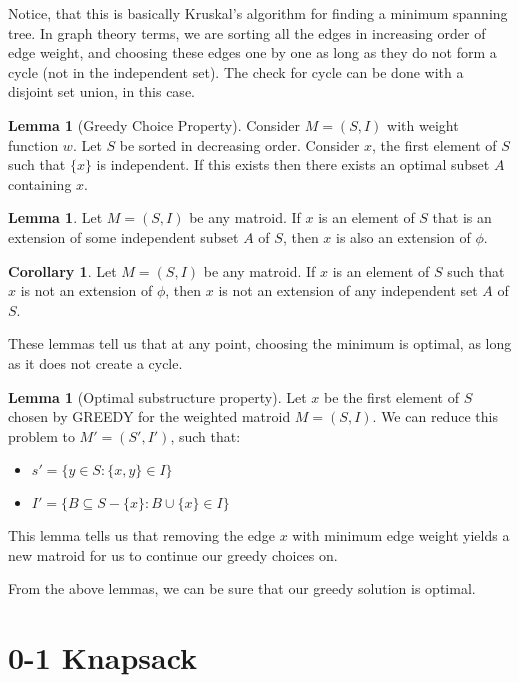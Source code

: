 \documentclass[12pt,letterpaper]{article}
\theoremstyle{definition}
\newtheorem{corollary}{Corollary}[theorem] %
\newtheorem{lemma}[theorem]{Lemma} %
\begin{document}
Notice, that this is basically Kruskal's algorithm for finding a minimum spanning tree. In graph theory terms, we are sorting all the edges in increasing order of edge weight, and choosing these edges one by one as long as they do not form a cycle (not in the independent set). The check for cycle can be done with a disjoint set union, in this case.

\begin{lemma}[Greedy Choice Property]
  Consider $M = (S,I)$ with weight function $w$. Let $S$ be sorted in decreasing order. Consider $x$, the first element of $S$ such that $\{x\} $ is independent. If this exists then there exists an optimal subset $A$ containing $x$.
\end{lemma}

\begin{lemma}
  Let $M = (S,I)$ be any matroid. If $x$ is an element of $S$ that is an extension of some independent subset $A$ of $S$, then $x$ is also an extension of $\phi$. 
\end{lemma}

\begin{corollary}
  Let $M = (S,I)$ be any matroid. If $x$ is an element of $S$ such that $x$ is not an extension of $\phi$, then $x$ is not an extension of any independent set $A$ of $S$. 
\end{corollary}

These lemmas tell us that at any point, choosing the minimum is optimal, as long as it does not create a cycle.

\begin{lemma}[Optimal substructure property]
  Let $x$ be the first element of $S$ chosen by GREEDY for the weighted matroid $M = (S,I)$. We can reduce this problem to $M' = (S',I')$, such that:
  \begin{itemize}
    \item $s' = \{y \in S : \{x,y\} \in I\}$
    \item $I' = \{B \subseteq S - \{x\} : B \cup \{x\} \in I\}$
  \end{itemize}
\end{lemma}

This lemma tells us that removing the edge $x$ with minimum edge weight yields a new matroid for us to continue our greedy choices on.

From the above lemmas, we can be sure that our greedy solution is optimal.

\section{0-1 Knapsack}
\end{document}
